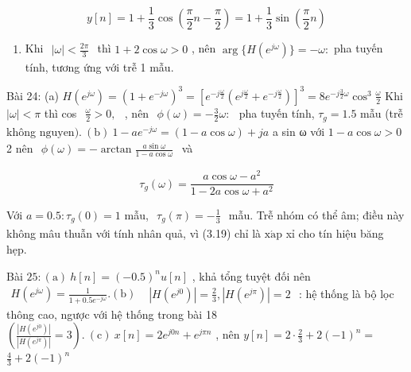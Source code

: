 \documentclass[
  10
]{article}
\providecommand{\tightlist}{%
  \setlength{\itemsep}{0pt}\setlength{\parskip}{0pt}}
\begin{document}
\[
y [ n ] = 1 + \frac {1}{3} \cos \left(\frac {\pi}{2} n - \frac {\pi}{2}\right) = 1 + \frac {1}{3} \sin \left(\frac {\pi}{2} n\right)
\]

\begin{enumerate}
\def\labelenumi{(\alph{enumi})}
\setcounter{enumi}{2}
\tightlist
\item
  Khi
  \(\begin{array} { r } { | \omega | < \frac { 2 \pi } { 3 } } \end{array}\)
  thì \(1 + 2 \cos \omega > 0\) , nên
  \(\arg \{ H ( e ^ { j \omega } ) \} = - \omega \colon\) pha tuyến
  tính, tương ứng với trễ 1 mẫu.
\end{enumerate}

Bài 24: (a)
\(H ( e ^ { j \omega } ) = ( 1 + e ^ { - j \omega } ) ^ { 3 } = \left[ e ^ { - j \frac { \omega } { 2 } } \left( e ^ { j \frac { \omega } { 2 } } + e ^ { - j \frac { \omega } { 2 } } \right) \right] ^ { 3 } = 8 e ^ { - j \frac { 3 } { 2 } \omega } \cos ^ { 3 } \frac { \omega } { 2 }\)
Khi \(| \omega | < \pi\) thì cos
\(\begin{array} { r } { \frac { \omega } { 2 } > 0 , } \end{array}\) ,
nên
\(\begin{array} { r } { \phi ( \omega ) = - \frac { 3 } { 2 } \omega : } \end{array}\)
pha tuyến tính, \(\tau _ { g } = 1 . 5\) mẫu (trễ không
\(\mathrm { n g u y } \mathrm { e n } ) . \ \mathrm { ( b ) } \ 1 - a e ^ { - j \omega } = \left( 1 - a \cos \omega \right) + j a\)
a sin ω với \(1 - a \cos \omega > 0\) 2 nên
\(\begin{array} { r } { \phi ( \omega ) = - \arctan \frac { a \sin \omega } { 1 - a \cos \omega } } \end{array}\)
và

\[
\tau_ {g} (\omega) = \frac {a \cos \omega - a ^ {2}}{1 - 2 a \cos \omega + a ^ {2}}
\]

Với \(a = 0 . 5 \colon \tau _ { g } ( 0 ) = 1\) mẫu,
\(\begin{array} { r } { \tau _ { g } ( \pi ) = - \frac { 1 } { 3 } } \end{array}\)
mẫu. Trễ nhóm có thể âm; điều này không mâu thuẫn với tính nhân quả, vì
(3.19) chỉ là \(\mathrm { x } \mathrm { \acute { a } p }\) xỉ cho tín
hiệu băng hẹp.

Bài
\(2 5 \colon { \mathrm { ( a ) ~ } } h [ n ] = ( - 0 . 5 ) ^ { n } u [ n ]\)
, khả tổng tuyệt đối nên
\(\begin{array} { r } { H ( e ^ { j \omega } ) = \frac { 1 } { 1 + 0 . 5 e ^ { - j \omega } } . { \mathrm { ( b ) } } } \end{array}\)
\(\begin{array} { r } { | H ( e ^ { j 0 } ) | = \frac { 2 } { 3 } , | H ( e ^ { j \pi } ) | = 2 } \end{array}\)
: hệ thống là bộ lọc thông cao, ngược với hệ thống trong bài 18
\(( { \frac { | H ( e ^ { j 0 } ) | } { | H ( e ^ { j \pi } ) | } } = 3 ) . { \mathrm { ~ ( c ) ~ } } x [ n ] = 2 e ^ { j 0 n } + e ^ { j \pi n }\)
, nên \(y [ n ] = 2 \cdot { \frac { 2 } { 3 } } + 2 ( - 1 ) ^ { n } =\)
\(\textstyle { \frac { 4 } { 3 } } + 2 ( - 1 ) ^ { n }\)
\end{document}
